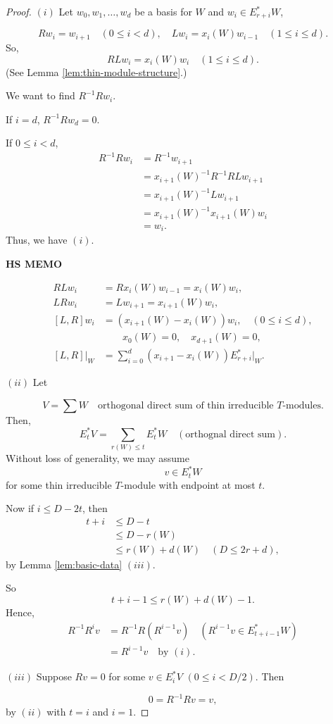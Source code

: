 \documentclass[
]{book}
\theoremstyle{definition}
\theoremstyle{definition}
\theoremstyle{definition}
\theoremstyle{definition}
\theoremstyle{remark}
\begin{document}
\begin{proof}
\leavevmode

\((i)\) Let \(w_0, w_1, \ldots, w_d\) be a basis for \(W\) and \(w_i\in E^*_{r+i}W\),

\[Rw_i = w_{i+1} \quad (0\leq i< d), \quad Lw_i = x_i(W)w_{i-1}\quad (1\leq i\leq d).\]
So,
\[RLw_i = x_i(W)w_i \quad (1\leq i\leq d).\]
(See Lemma \ref{lem:thin-module-structure}.)

We want to find \(R^{-1}Rw_i\).

If \(i=d\), \(R^{-1}Rw_d = 0\).

If \(0\leq i<d\),
\begin{align}
R^{-1}Rw_i & = R^{-1}w_{i+1}\\
& = x_{i+1}(W)^{-1}R^{-1}RLw_{i+1}\\
& = x_{i+1}(W)^{-1}Lw_{i+1}\\
& = x_{i+1}(W)^{-1}x_{i+1}(W)w_i\\
& = w_i.
\end{align}
Thus, we have \((i)\).

\textbf{HS MEMO}

\begin{align}
RLw_i & = Rx_i(W)w_{i-1} = x_i(W)w_i,\\
LRw_i & = Lw_{i+1} = x_{i+1}(W)w_i,\\
[L,R]w_i & = (x_{i+1}(W)-x_i(W))w_i, \quad (0\leq i\leq d),\\
& \qquad x_0(W) = 0, \quad x_{d+1}(W) = 0, \\
[L,R]|_W & = \sum_{i=0}^d(x_{i+1}-x_i(W))E^*_{r+i}|_W.
\end{align}

\((ii)\) Let

\[V = \sum W \quad \text{orthogonal direct sum of thin irreducible $T$-modules.}\]
Then,
\[E^*_tV = \sum_{r(W)\leq t}E^*_tW\quad (\text{orthognal direct sum}).\]
Without loss of generality, we may assume
\[v\in E^*_t W\]
for some thin irreducible \(T\)-module with endpoint at most \(t\).

Now if \(i\leq D-2t\), then
\begin{align}
t+i & \leq D-t \\
& \leq D-r(W)\\
& \leq r(W) + d(W) \quad (D\leq 2r+d),
\end{align}
by Lemma \ref{lem:basic-data} \((iii)\).

So
\[t+i-1\leq r(W) + d(W) -1.\]
Hence,
\begin{align}
R^{-1}R^iv & = R^{-1}R(R^{i-1}v) \quad (R^{i-1}v\in E^*_{t+i-1}W)\\
& = R^{i-1}v \quad \text{by $(i)$.}
\end{align}

\((iii)\) Suppose \(Rv = 0\) for some \(v\in E^*_iV\) \((0\leq i< D/2)\). Then

\[0 = R^{-1}Rv = v,\]
by \((ii)\) with \(t = i\) and \(i=1\).

\end{proof}
\end{document}
